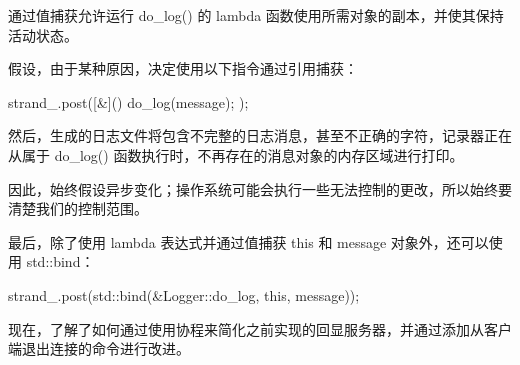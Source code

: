 通过值捕获允许运行 do\_log() 的 lambda 函数使用所需对象的副本，并使其保持活动状态。

假设，由于某种原因，决定使用以下指令通过引用捕获：

\begin{cpp}
strand_.post([&]() { do_log(message); });
\end{cpp}

然后，生成的日志文件将包含不完整的日志消息，甚至不正确的字符，记录器正在从属于 do\_log() 函数执行时，不再存在的消息对象的内存区域进行打印。

因此，始终假设异步变化；操作系统可能会执行一些无法控制的更改，所以始终要清楚我们的控制范围。

最后，除了使用 lambda 表达式并通过值捕获 this 和 message 对象外，还可以使用 std::bind：

\begin{cpp}
strand_.post(std::bind(&Logger::do_log, this, message));
\end{cpp}

现在，了解了如何通过使用协程来简化之前实现的回显服务器，并通过添加从客户端退出连接的命令进行改进。



















